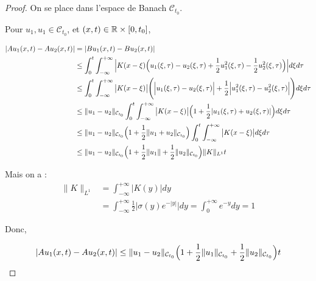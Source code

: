 \begin{proof}
    On se place dans l'espace de Banach $\mathcal{C}_{t_0}$. 
    
    Pour $u_1,u_1 \in \mathcal{C}_{t_0}$, et $(x,t) \in \mathbb{R} \times [0,t_0]$,

    \begin{equation*}
    \begin{split}
        |Au_1(x,t) - Au_2(x,t)| &= |Bu_1(x,t) - Bu_2(x,t)| \\ 
        &\leq \int_{0}^{t} \int_{-\infty}^{+\infty} \Big| K(x-\xi) \Bigl( u_1(\xi,\tau) - u_2(\xi,\tau)+ \frac{1}{2}u_1^2(\xi,\tau) - \frac{1}{2}u_2^2(\xi,\tau) \Bigr) \Big| d\xi d\tau \\
        &\leq \int_{0}^{t} \int_{-\infty}^{+\infty} \big| K(x-\xi) \big| \Biggl( \Big| u_1(\xi,\tau) - u_2(\xi,\tau) \Big| + \frac{1}{2}\Big| u_1^2(\xi,\tau) - u_2^2(\xi,\tau) \Big| \Biggr)d\xi d\tau \\
        &\leq \|u_1 - u_2\|_{\mathcal{C}_{t_0}} \int_{0}^{t} \int_{-\infty}^{+\infty} \big| K(x-\xi) \big| \Bigl( 1 + \frac{1}{2} | u_1(\xi,\tau) + u_2(\xi,\tau) | \Bigr) d\xi d\tau \\
        &\leq \|u_1 - u_2\|_{\mathcal{C}_{t_0}} \Bigl( 1 + \frac{1}{2} \| u_1 + u_2 \|_{\mathcal{C}_{t_0}} \Bigr) \int_{0}^{t} \int_{-\infty}^{+\infty} \big| K(x-\xi) \big| d\xi d\tau \\
        &\leq \|u_1 - u_2\|_{\mathcal{C}_{t_0}} \Bigl( 1 + \frac{1}{2} \| u_1\|+ \frac{1}{2} \|u_2 \|_{\mathcal{C}_{t_0}} \Bigr) \|K\|_{L^1} t
    \end{split}
    \end{equation*}

    Mais on a : 
    \begin{equation*}
    \begin{split}
        \|K\|_{L^1} &= \int_{-\infty}^{+\infty} \big| K(y) \big| dy \\
        &= \int_{-\infty}^{+\infty} \frac{1}{2} \big| \sigma(y)e^{-|y|} \big| dy = \int_{0}^{+\infty} e^{-y} dy = 1
    \end{split}
    \end{equation*}

    Donc, 

    $$|Au_1(x,t) - Au_2(x,t)| \leq \|u_1 - u_2\|_{\mathcal{C}_{t_0}} \Bigl( 1 + \frac{1}{2} \| u_1\|_{\mathcal{C}_{t_0}}+ \frac{1}{2} \|u_2 \|_{\mathcal{C}_{t_0}} \Bigr) t$$
    
    \vspace{1em}


\end{proof}
